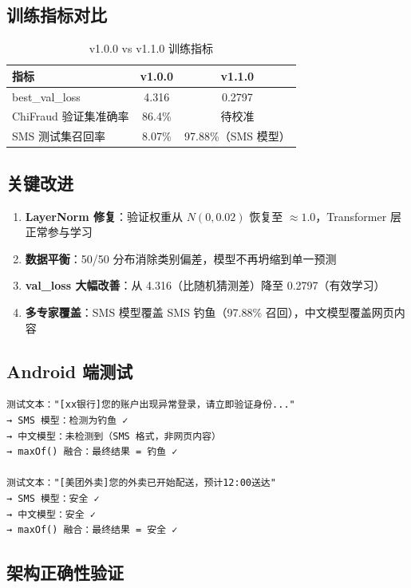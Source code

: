 \documentclass[11pt,a4paper]{article}
\begin{document}
\subsection{训练指标对比}

\begin{table}[H]
\centering
\caption{v1.0.0 vs v1.1.0 训练指标}
\begin{tabular}{lcc}
\toprule
指标 & v1.0.0 & v1.1.0 \\
\midrule
best\_val\_loss & 4.316 & 0.2797 \\
ChiFraud 验证集准确率 & 86.4\% & 待校准 \\
SMS 测试集召回率 & 8.07\% & 97.88\%（SMS 模型） \\
\bottomrule
\end{tabular}
\end{table}

\subsection{关键改进}

\begin{enumerate}
  \item \textbf{LayerNorm 修复}：验证权重从 $N(0, 0.02)$ 恢复至 $\approx 1.0$，Transformer 层正常参与学习
  \item \textbf{数据平衡}：50/50 分布消除类别偏差，模型不再坍缩到单一预测
  \item \textbf{val\_loss 大幅改善}：从 4.316（比随机猜测差）降至 0.2797（有效学习）
  \item \textbf{多专家覆盖}：SMS 模型覆盖 SMS 钓鱼（97.88\% 召回），中文模型覆盖网页内容
\end{enumerate}

\subsection{Android 端测试}

\begin{Verbatim}[frame=single,fontsize=\small,label=maxOf() 融合测试结果]
测试文本："[xx银行]您的账户出现异常登录，请立即验证身份..."
→ SMS 模型：检测为钓鱼 ✓
→ 中文模型：未检测到（SMS 格式，非网页内容）
→ maxOf() 融合：最终结果 = 钓鱼 ✓

测试文本："[美团外卖]您的外卖已开始配送，预计12:00送达"
→ SMS 模型：安全 ✓
→ 中文模型：安全 ✓
→ maxOf() 融合：最终结果 = 安全 ✓
\end{Verbatim}

\subsection{架构正确性验证}
\end{document}
